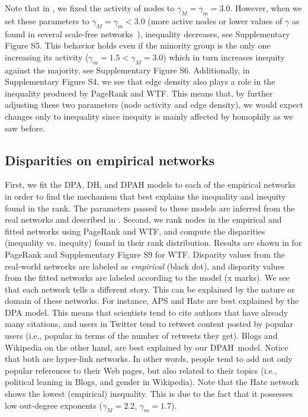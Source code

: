 \documentclass[fleqn,10pt]{wlscirep}
\begin{document}
Note that in , we fixed the activity of nodes to $\gamma_M=\gamma_m=3.0$. 
However, when we set these parameters to $\gamma_M=\gamma_m<3.0$ (more active nodes or lower values of $\gamma$ as found in several scale-free networks~\cite{albert2002statistical}), inequality decreases, see Supplementary Figure S5. 
This behavior holds even if the minority group is the only one increasing its activity ($\gamma_m=1.5 < \gamma_M=3.0$) which in turn increases inequity against the majority, see Supplementary Figure S6.
Additionally, in Supplementary Figure S4, we see that edge density also plays a role in the inequality produced by PageRank and WTF. 
This means that, by further adjusting these two parameters (node activity and edge density), we would expect changes only to inequality since inequity is mainly affected by homophily as we saw before.



 



\subsection*{Disparities on empirical networks}
First, we fit the DPA, DH, and DPAH models to each of the empirical networks in order to find the mechanism that best explains the inequality and inequity found in the rank. The parameters passed to these models are inferred from the real networks and described in .
Second, we rank nodes in the empirical and fitted networks using PageRank and WTF, and compute the disparities (inequality vs. inequity) found in their rank distribution. Results are shown in  for PageRank and Supplementary Figure S9 for WTF. Disparity values from the real-world networks are labeled as \textit{empirical} (black dot), and disparity values from the fitted networks are labeled according to the model (x marks). 
We see that each network tells a different story.
This can be explained by the nature or domain of these networks. For instance, APS and Hate are best explained by the DPA model. This means that scientists tend to cite authors that have already many citations, and users in Twitter tend to retweet content posted by popular users (i.e., popular in terms of the number of retweets they get). Blogs and Wikipedia on the other hand, are best explained by our {DPAH}~model. Notice that both are hyper-link networks. In other words, people tend to add not only popular references to their Web pages, but also related to their topics (i.e., political leaning in Blogs, and gender in Wikipedia). 
Note that the Hate network shows the lowest (empirical) inequality. This is due to the fact that it possesses low out-degree exponents ($\gamma_M=2.2$, $\gamma_m=1.7$). 
\end{document}
